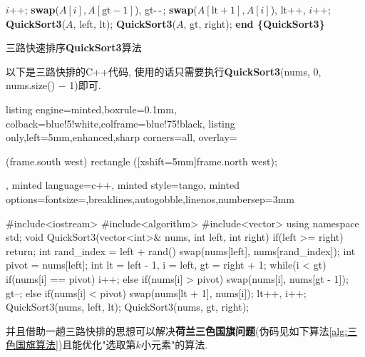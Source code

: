 \documentclass{article}
\begin{document}
\begin{homeworkProblem}
\begin{algorithm}[H]
\begin{algorithmic}[1]
				\State $i$++; 
			 
				\State \textbf{swap}($A[i],A[\text{gt}-1]$), gt$\text{-\,-}$; 
			 
				\State \textbf{swap}($A[\text{lt}+1],A[i]$), lt$\text{++}$, $i\text{++}$; 
			\EndIf
		\EndWhile
		\State \textbf{QuickSort3}($A$, left, lt); 
		\State \textbf{QuickSort3}($A$, gt, right); 
		\State \textbf{end \{QuickSort3\}}
		\end{algorithmic}
		\caption{三路快速排序\textbf{QuickSort3}算法}
		\label{alg:三路快速排序}
	\end{algorithm}
	\newpage
	以下是三路快排的C++代码, 使用的话只需要执行\textbf{QuickSort3}(nums, 0, nums.size() $-$ 1)即可.
\begin{tcblisting}{listing engine=minted,boxrule=0.1mm,
colback=blue!5!white,colframe=blue!75!black,
listing only,left=5mm,enhanced,sharp corners=all,
overlay={\begin{tcbclipinterior} (frame.south west)
rectangle ([xshift=5mm]frame.north west);\end{tcbclipinterior}},
minted language=c++,
minted style=tango,
minted options={fontsize=\small,breaklines,autogobble,linenos,numbersep=3mm}}
#include<iostream>
#include<algorithm>
#include<vector>
using namespace std;
void QuickSort3(vector<int>& nums, int left, int right) {
    if(left >= right) {
        return;
    }
    int rand_index = left + rand()%
    swap(nums[left], nums[rand_index]);
    int pivot = nums[left];
    int lt = left - 1, i = left, gt = right + 1;
    while(i < gt) {
        if(nums[i] == pivot) {
            i++;
        }
        else if(nums[i] > pivot) {
            swap(nums[i], nums[gt - 1]);
            gt--;
        }
        else if(nums[i] < pivot) {
            swap(nums[lt + 1], nums[i]);
            lt++, i++;
        }
    }
    QuickSort3(nums, left, lt);
    QuickSort3(nums, gt, right);
}
\end{tcblisting}
并且借助一趟三路快排的思想可以解决\textbf{荷兰三色国旗问题}(伪码见如下算法\ref{alg:三色国旗算法})且能优化"选取第$k$小元素"的算法.
\begin{algorithm}[H]
	\begin{algorithmic}[1]

\end{algorithmic}
\end{algorithm}
\end{homeworkProblem}
\end{document}
